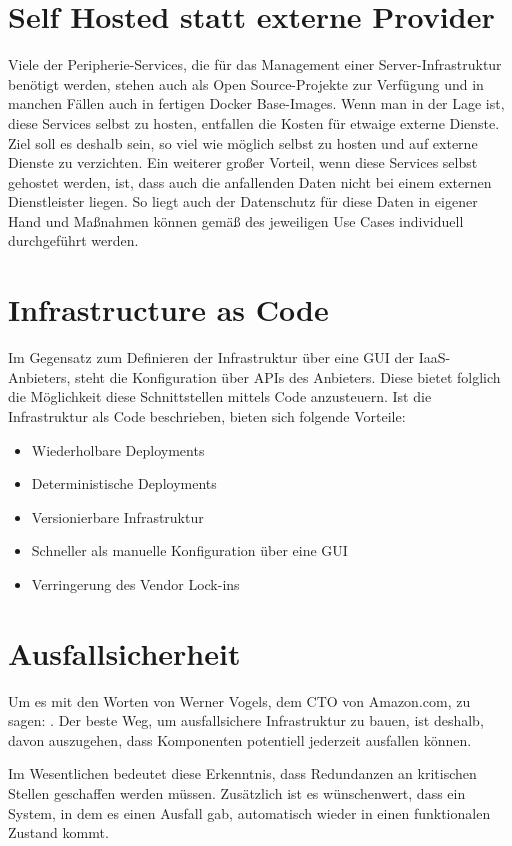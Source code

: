 \section{Self Hosted statt externe Provider}
Viele der Peripherie-Services, die für das Management einer Server-Infrastruktur
benötigt werden,
stehen auch als Open Source-Projekte zur Verfügung und in manchen Fällen
auch in fertigen Docker Base-Images.
Wenn man in der Lage ist, diese Services selbst zu hosten, entfallen die
Kosten für etwaige externe Dienste.
Ziel soll es deshalb sein, so viel wie möglich selbst zu hosten und auf externe
Dienste zu verzichten.
Ein weiterer großer Vorteil, wenn diese Services selbst gehostet werden, ist,
dass auch die
anfallenden Daten nicht bei einem externen Dienstleister liegen. So liegt auch
der Datenschutz für diese Daten in eigener Hand
und Maßnahmen können gemäß des jeweiligen Use Cases individuell durchgeführt
werden.


\section{Infrastructure as Code}
Im Gegensatz zum Definieren der Infrastruktur über eine GUI der IaaS-Anbieters,
steht die Konfiguration über APIs des Anbieters.
Diese bietet folglich die Möglichkeit diese Schnittstellen mittels Code anzusteuern.
Ist die Infrastruktur als Code beschrieben, bieten sich folgende Vorteile:

\begin{itemize}
  \item Wiederholbare Deployments
  \item Deterministische Deployments
  \item Versionierbare Infrastruktur
  \item Schneller als manuelle Konfiguration über eine GUI
  \item Verringerung des Vendor Lock-ins
\end{itemize}

\section{Ausfallsicherheit}
Um es mit den Worten von Werner Vogels, dem CTO von Amazon.com, zu sagen:
 \cite{everythingfails}.
Der beste Weg, um ausfallsichere Infrastruktur zu bauen,
ist deshalb, davon auszugehen, dass Komponenten potentiell jederzeit
ausfallen können.

Im Wesentlichen bedeutet diese Erkenntnis,
dass Redundanzen an kritischen Stellen geschaffen werden müssen.
Zusätzlich ist es wünschenwert, dass ein System, in dem es einen Ausfall gab,
automatisch wieder in einen funktionalen Zustand kommt.

